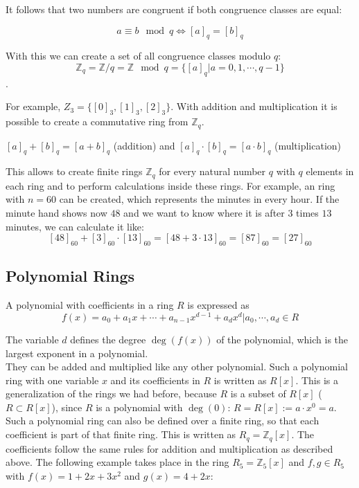 It follows that two numbers are congruent if both congruence classes are equal:

$$a \equiv b \mod q \Leftrightarrow [a]_q = [b]_q$$

With this we can create a set of all congruence classes modulo $q$:
$$\mathbb{Z}_q = \mathbb{Z}/q = \mathbb{Z} \mod q = \{[a]_q | a = 0, 1, \cdots, q-1 \}$$.

For example, $Z_3 = \{[0]_3, [1]_3, [2]_3\}$. With addition and multiplication it is possible to create a commutative ring from $\mathbb{Z}_q$.
\begin{center}
  $[a]_q + [b]_q = [a+b]_q$ (addition) and $[a]_q \cdot [b]_q = [a\cdot b]_q$ (multiplication)
\end{center}

This allows to create finite rings $\mathbb{Z}_q$ for every natural number $q$ with $q$ elements in each ring and to perform calculations inside these rings. For example, an ring with $n=60$ can be created, which represents the minutes in every hour. If the minute hand shows now $48$ and we want to know where it is after $3$ times $13$ minutes, we can calculate it like:
$$[48]_{60} + [3]_{60}\cdot [13]_{60} = [48+3\cdot 13]_{60} = [87]_{60} = [27]_{60}$$

\subsection*{Polynomial Rings}

A polynomial with coefficients in a ring $R$ is expressed as 
$$f(x) = a_0+ a_1x+\cdots+ a_{n-1}x^{d-1}+a_dx^d | a_0, \cdots, a_d \in R$$

The variable $d$ defines the degree $\deg(f(x))$ of the polynomial, which is the largest exponent in a polynomial.\\
They can be added and multiplied like any other polynomial. Such a polynomial ring with one variable $x$ and its coefficients in $R$ is written as $R[x]$. This is a generalization of the rings we had before, because $R$ is a subset of $R[x]$ ($R \subset R[x]$), since $R$ is a polynomial with $\deg(0)$: $R = R[x] := a\cdot x^0 = a$.\\
Such a polynomial ring can also be defined over a finite ring, so that each coefficient is part of that finite ring. This is written as $R_q = \mathbb{Z}_q[x]$. The coefficients follow the same rules for addition and multiplication as described above. The following example takes place in the ring $R_5 = \mathbb{Z}_5[x]$ and $f, g \in R_5$ with $f(x)=1+2x+3x^2$ and $g(x)=4+2x$:


